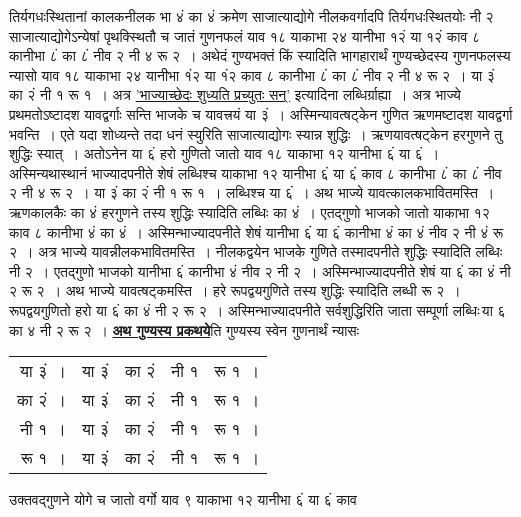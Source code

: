 \documentclass[11pt, openany]{book}
\begin{document}
\newpage

\begin{sloppypar}
\noindent तिर्यगधःस्थितानां कालकनीलक भा ४ं का ४ं क्रमेण साजात्याद्योगे नीलकवर्गादपि तिर्यगधःस्थितयोः नी २ साजात्याद्योगेऽन्येषां पृथक्स्थितौ च जातं गुणनफलं याव १८ याकाभा २४ यानीभा १२ं या १२ं काव ८ कानीभा ८ं का ८ं नीव २ नी ४ रू २~। अथेदं गुण्यभक्तं किं स्यादिति भागहारार्थं गुण्यच्छेदस्य गुणनफलस्य न्यासो याव १८ याकाभा २४ यानीभा १ं२ या १ं२ काव ८ कानीभा ८ं का ८ं नीव २ नी ४ रू २~। या ३ं का २ं नी १ रू १~। अत्र \hyperref[3.29]{'भाज्याच्छेदः शुध्यति प्रच्युतः सन्'} इत्यादिना लब्धिर्ग्राह्या~। अत्र भाज्ये प्रथमतोऽष्टादश यावद्वर्गाः सन्ति भाजके च यावत्त्रयं या ३ं~। अस्मिन्यावत्षट्केन गुणित ऋणमष्टादश यावद्वर्गा भवन्ति~। एते यदा शोध्यन्ते तदा धनं स्युरिति साजात्याद्योगः स्यान्न शुद्धिः~। ऋणयावत्षट्केन हरगुणने तु शुद्धिः स्यात्~। अतोऽनेन या ६ं हरो गुणितो जातो याव १८ याकाभा १२ यानीभा ६ं या ६ं~। अस्मिन्यथास्थानं भाज्यादपनीते शेषं लब्धिश्च याकाभा १२ यानीभा ६ं या ६ं काव ८ कानीभा ८ं का ८ं नीव २ नी ४ रू २~। या ३ं का २ं नी १ रू १~। लब्धिश्च या ६ं~। अथ भाज्ये यावत्कालकभावितमस्ति~। ऋणकालकैः का ४ं हरगुणने तस्य शुद्धिः स्यादिति लब्धिः का ४ं~। एतद्गुणो भाजको जातो याकाभा १२ काव ८ कानीभा ४ं का ४ं~। अस्मिन्भाज्यादपनीते शेषं यानीभा ६ं या ६ं कानीभा ४ं का ४ं नीव २ नी ४ं रू २~। अत्र भाज्ये यावन्नीलकभावितमस्ति~। नीलकद्वयेन भाजके गुणिते तस्मादपनीते शुद्धिः स्यादिति लब्धिः\textendash \,नी २~। एतद्गुणो भाजको यानीभा ६ं कानीभा ४ं नीव २ नी २~। अस्मिन्भाज्यादपनीते शेषं या ६ं का ४ं नी २ रू २~। अथ भाज्ये यावत्षट्कमस्ति~। हरे रूपद्वयगुणिते तस्य  शुद्धिः स्यादिति लब्धी रू २~। रूपद्वयगुणितो हरो या ६ं का ४ं नी २ रू २~। अस्मिन्भाज्यादपनीते सर्वशुद्धिरिति जाता सम्पूर्णा लब्धिः\textendash \,या ६ का ४ नी २ रू २~। \hyperref[3.33]{\textbf{अथ गुण्यस्य प्रकथये}}ति गुण्यस्य स्वेन गुणनार्थं न्यासः\textendash

\begin{center}
\begin{tabular}{rllll}
या ३ं~। & या ३ं & का २ं & नी १ & रू १~। \\
का २ं~। & या ३ं & का २ं & नी १ & रू १~।\\
नी १~। & या ३ं & का २ं & नी १ & रू १~।\\
रू १~। & या ३ं & का २ं & नी १ & रू १~।
\end{tabular}
\end{center}

\noindent उक्तवद्गुणने योगे च जातो वर्गो याव ९ याकाभा १२ यानीभा ६ं या ६ं काव
\end{sloppypar}

\newpage
\end{document}
